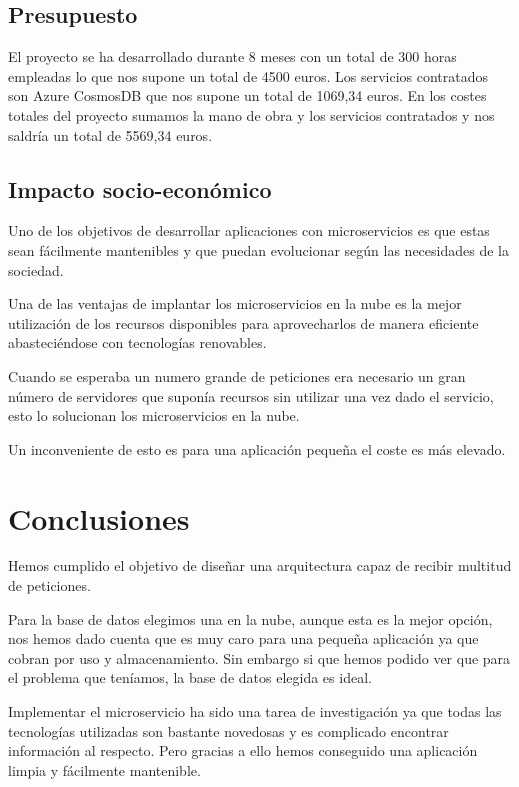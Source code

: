 \documentclass[12pt]{report} %
\begin{document}
	\subsection{Presupuesto}
	
	
	El proyecto se ha desarrollado durante 8 meses con un total de 300 horas empleadas lo que nos supone un total de 4500 euros. 
	Los servicios contratados son Azure CosmosDB que nos supone un total de 1069,34 euros.
	En los costes totales del proyecto sumamos la mano de obra y los servicios contratados y nos saldría un total de 5569,34 euros.
	
	
	\subsection{Impacto socio-económico}
	
	Uno de los objetivos de desarrollar aplicaciones con microservicios es que estas sean fácilmente mantenibles y que puedan evolucionar según las necesidades de la sociedad.
	
	Una de las ventajas de implantar los microservicios en la nube es la mejor utilización de los recursos disponibles para aprovecharlos de manera eficiente abasteciéndose con tecnologías renovables.
	
	Cuando se esperaba un numero grande de peticiones era necesario un gran número de servidores que suponía recursos sin utilizar una vez dado el servicio, esto lo solucionan los microservicios en la nube.
	
	Un inconveniente de esto es para una aplicación pequeña el coste es más elevado.
	
	\section{Conclusiones}
	
	Hemos cumplido el objetivo de diseñar una arquitectura capaz de recibir multitud de peticiones.
	
	Para la base de datos elegimos una en la nube, aunque esta es la mejor opción, nos hemos dado cuenta que es muy caro para una pequeña aplicación ya que cobran por uso y almacenamiento. Sin embargo si que hemos podido ver que para el problema que teníamos, la base de datos elegida es ideal.
	
	Implementar el microservicio ha sido una tarea de investigación ya que todas las tecnologías utilizadas son bastante novedosas y es complicado encontrar información al respecto. Pero gracias a ello hemos conseguido una aplicación limpia y fácilmente mantenible.
	
\end{document}
